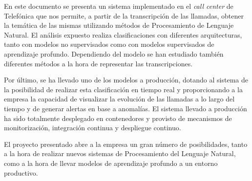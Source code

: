 
En este documento se presenta un sistema implementado en el \textit{call center} de Telefónica que nos 
 permite, a partir de la transcripción de las llamadas, obtener la temática de las mismas utilizando métodos de Procesamiento de Lenguaje Natural. El análisis expuesto realiza clasificaciones con diferentes arquitecturas, tanto con modelos no supervisados como con modelos supervisados de aprendizaje profundo. Dependiendo del modelo se han estudiado también diferentes métodos a la hora de representar las transcripciones.
 
 Por último, se ha llevado uno de los modelos a producción, dotando al sistema de la posibilidad de realizar esta clasificación en tiempo real y proporcionando a la empresa la capacidad de visualizar la evolución de las llamadas a lo largo del tiempo y de generar alertas en base a anomalías. El sistema llevado a producción ha sido totalmente desplegado en contenedores y provisto de mecanismos  de monitorización, integración continua y despliegue continuo. 
 
El proyecto presentado abre a la empresa un gran número de posibilidades, tanto a la hora de  realizar nuevos sistemas de Procesamiento del Lenguaje Natural, como a la hora de llevar modelos de aprendizaje profundo a un entorno productivo.
 








